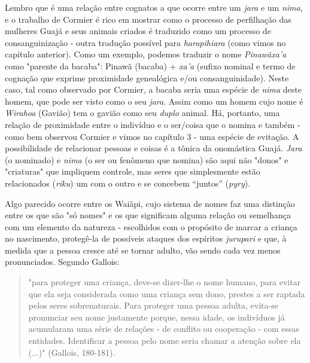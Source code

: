 Lembro que é uma relação entre cognatos a que ocorre entre um
\emph{jara} e um \emph{nima}, e o trabalho de Cormier é rico em mostrar
como o processo de perfilhação das mulheres Guajá e seus animais criados
é traduzido como um processo de consanguinização - outra tradução
possível para \emph{harapihiara} (como vimos no capítulo anterior). Como
um exemplo, podemos traduzir o nome \emph{Pinawãxa'a} como "parente da
bacaba": Pinawã (bacaba) + \emph{xa'a} (sufixo nominal e termo de
cognação que exprime proximidade genealógica e/ou consanguinidade).
Neste caso, tal como observado por Cormier, a bacaba seria uma espécie
de \emph{nima} deste homem, que pode ser visto como o seu \emph{jara}.
Assim como um homem cujo nome é \emph{Wirahoa} (Gavião) tem o gavião
como seu \emph{duplo} animal. Há, portanto, uma relação de proximidade
entre o indivíduo e o ser/coisa que o nomina e também - como bem
observou Cormier e vimos no capítulo 3 - uma espécie de evitação. A
possibilidade de relacionar pessoas e coisas é a tônica da onomástica
Guajá. \emph{Jara} (o nominado) e \emph{nima} (o ser ou fenômeno que
nomina) são aqui não "donos" e "criaturas" que impliquem controle, mas
seres que simplesmente estão relacionados (\emph{riku}) um com o outro e
se concebem ``juntos'' (\emph{pyry}).

Algo parecido ocorre entre os Waiãpi, cujo sistema de nomes faz uma
distinção entre os que são "só nomes" e os que significam alguma relação
ou semelhança com um elemento da natureza - escolhidos com o propósito
de marcar a criança no nascimento, protegê-la de possíveis ataques dos
espíritos \emph{jurupari} e que, à medida que a pessoa cresce até se
tornar adulto, vão sendo cada vez menos pronunciados. Segundo Gallois:

\begin{quote}
"para proteger uma criança, deve-se dizer-lhe o nome humano, para evitar
que ela seja considerada como uma criança sem dono, prestes a ser
raptada pelos seres sobrenaturais. Para proteger uma pessoa adulta,
evita-se pronunciar seu nome justamente porque, nessa idade, os
indivíduos já acumularam uma série de relações - de conflito ou
cooperação - com essas entidades. Identificar a pessoa pelo nome seria
chamar a atenção sobre ela (...)" (Gallois, 180-181).
\end{quote}

